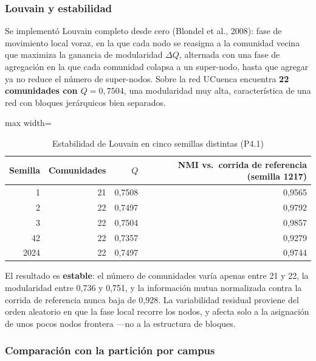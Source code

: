 \documentclass[10pt,a4paper]{extarticle}
\begin{document}
\subsubsection{Louvain y estabilidad}

Se implementó Louvain completo desde cero (Blondel et al., 2008): fase de movimiento local
voraz, en la que cada nodo se reasigna a la comunidad vecina que maximiza la ganancia de
modularidad $\Delta Q$, alternada con una fase de agregación en la que cada comunidad
colapsa a un super-nodo, hasta que agregar ya no reduce el número de super-nodos. Sobre la
red UCuenca encuentra \textbf{22 comunidades con $Q = 0{,}7504$}, una modularidad muy alta,
característica de una red con bloques jerárquicos bien separados.

\begin{table}[H]
\centering
\caption{Estabilidad de Louvain en cinco semillas distintas (P4.1)}
\label{tab:louvain}
\small
\begin{adjustbox}{max width=\textwidth}
\begin{tabular}{rrrr}
\toprule
\textbf{Semilla} & \textbf{Comunidades} & \textbf{$Q$} & \textbf{NMI vs.\ corrida de referencia (semilla 1217)} \\
\midrule
1    & 21 & 0,7508 & 0,9565 \\
2    & 22 & 0,7497 & 0,9792 \\
3    & 22 & 0,7504 & 0,9857 \\
42   & 22 & 0,7357 & 0,9279 \\
2024 & 22 & 0,7497 & 0,9744 \\
\bottomrule
\end{tabular}
\end{adjustbox}
\end{table}

El resultado es \textbf{estable}: el número de comunidades varía apenas entre 21 y 22, la
modularidad entre 0,736 y 0,751, y la información mutua normalizada contra la corrida de
referencia nunca baja de 0,928. La variabilidad residual proviene del orden aleatorio en que
la fase local recorre los nodos, y afecta solo a la asignación de unos pocos nodos frontera
---no a la estructura de bloques.

\subsubsection{Comparación con la partición por campus}
\end{document}
